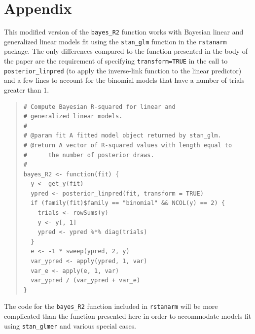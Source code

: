 \documentclass[11pt]{article}
\begin{document}




\clearpage
\section*{Appendix}

This modified version of the \verb#bayes_R2# function works with
Bayesian linear and generalized linear models fit using the 
\verb#stan_glm# function in the {\tt rstanarm} package. The only 
differences compared to the function presented in the body of the paper are 
the requirement of specifying \verb#transform=TRUE# in the call to 
\verb#posterior_linpred# (to apply the inverse-link function to the linear 
predictor) and a few lines to account for the binomial models that
have a number of trials greater than 1. 
%
\vspace{-\baselineskip}
\begin{quotation}
\noindent
\begin{small}
\begin{verbatim}
# Compute Bayesian R-squared for linear and
# generalized linear models.
#
# @param fit A fitted model object returned by stan_glm.
# @return A vector of R-squared values with length equal to
#      the number of posterior draws.
#
bayes_R2 <- function(fit) {
  y <- get_y(fit)
  ypred <- posterior_linpred(fit, transform = TRUE)
  if (family(fit)$family == "binomial" && NCOL(y) == 2) {
    trials <- rowSums(y)
    y <- y[, 1]
    ypred <- ypred %*% diag(trials)
  }
  e <- -1 * sweep(ypred, 2, y)
  var_ypred <- apply(ypred, 1, var)
  var_e <- apply(e, 1, var)
  var_ypred / (var_ypred + var_e)
}
\end{verbatim}
\end{small}
\end{quotation}

\noindent The code for the \verb#bayes_R2# function included in {\tt rstanarm} will be 
more complicated than the function presented here in order to accommodate models fit 
using \verb#stan_glmer# and various special cases.
\end{document}
